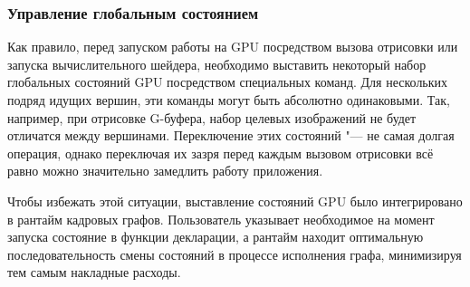 \subsubsection{Управление глобальным состоянием}
Как правило, перед запуском работы на GPU посредством вызова отрисовки или запуска вычислительного шейдера, необходимо выставить некоторый набор глобальных состояний GPU посредством специальных команд.
Для нескольких подряд идущих вершин, эти команды могут быть абсолютно одинаковыми.
Так, например, при отрисовке G-буфера, набор целевых изображений не будет отличатся между вершинами.
Переключение этих состояний "--- не самая долгая операция, однако переключая их зазря перед каждым вызовом отрисовки всё равно можно значительно замедлить работу приложения.

Чтобы избежать этой ситуации, выставление состояний GPU было интегрировано в рантайм кадровых графов.
Пользователь указывает необходимое на момент запуска состояние в функции декларации, а рантайм находит оптимальную последовательность смены состояний в процессе исполнения графа, минимизируя тем самым накладные расходы.

